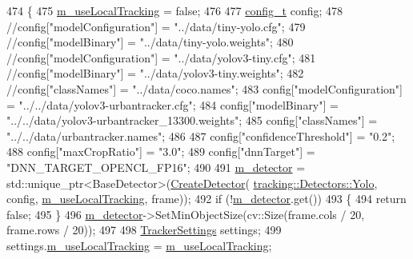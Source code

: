 \begin{DoxyCode}
474     \{
475         \mbox{\hyperlink{class_video_example_a951ee017c4fbb180dfc965a9a35ac69f}{m\_useLocalTracking}} = \textcolor{keyword}{false};
476 
477         \mbox{\hyperlink{defines_8h_a81d657237a541d02f8eeefdd40191920}{config\_t}} config;
478         \textcolor{comment}{//config["modelConfiguration"] = "../data/tiny-yolo.cfg";}
479         \textcolor{comment}{//config["modelBinary"] = "../data/tiny-yolo.weights";}
480         \textcolor{comment}{//config["modelConfiguration"] = "../data/yolov3-tiny.cfg";}
481         \textcolor{comment}{//config["modelBinary"] = "../data/yolov3-tiny.weights";}
482         \textcolor{comment}{//config["classNames"] = "../data/coco.names";}
483         config[\textcolor{stringliteral}{"modelConfiguration"}] = \textcolor{stringliteral}{"../../data/yolov3-urbantracker.cfg"};
484         config[\textcolor{stringliteral}{"modelBinary"}] = \textcolor{stringliteral}{"../../data/yolov3-urbantracker\_13300.weights"};
485         config[\textcolor{stringliteral}{"classNames"}] = \textcolor{stringliteral}{"../../data/urbantracker.names"};
486 
487         config[\textcolor{stringliteral}{"confidenceThreshold"}] = \textcolor{stringliteral}{"0.2"};
488         config[\textcolor{stringliteral}{"maxCropRatio"}] = \textcolor{stringliteral}{"3.0"};
489         config[\textcolor{stringliteral}{"dnnTarget"}] = \textcolor{stringliteral}{"DNN\_TARGET\_OPENCL\_FP16"};
490 
491         \mbox{\hyperlink{class_video_example_a00fee4b18b68d605b87051f3bdaa1c92}{m\_detector}} = std::unique\_ptr<BaseDetector>(\mbox{\hyperlink{_base_detector_8cpp_a7648f35ed8e9d0160414d8e0eaf99c15}{CreateDetector}}(
      \mbox{\hyperlink{namespacetracking_a1edf574df68abf048988b7cbacc52760a89a6bc82129abb9692c1a368724c4791}{tracking::Detectors::Yolo}}, config, \mbox{\hyperlink{class_video_example_a951ee017c4fbb180dfc965a9a35ac69f}{m\_useLocalTracking}}, frame));
492         \textcolor{keywordflow}{if} (!\mbox{\hyperlink{class_video_example_a00fee4b18b68d605b87051f3bdaa1c92}{m\_detector}}.get())
493         \{
494             \textcolor{keywordflow}{return} \textcolor{keyword}{false};
495         \}
496         \mbox{\hyperlink{class_video_example_a00fee4b18b68d605b87051f3bdaa1c92}{m\_detector}}->SetMinObjectSize(cv::Size(frame.cols / 20, frame.rows / 20));
497 
498         \mbox{\hyperlink{struct_tracker_settings}{TrackerSettings}} settings;
499         settings.\mbox{\hyperlink{struct_tracker_settings_a64f4e2f0b2eaeae47316690ab5a5e620}{m\_useLocalTracking}} = \mbox{\hyperlink{class_video_example_a951ee017c4fbb180dfc965a9a35ac69f}{m\_useLocalTracking}};

\end{DoxyCode}
